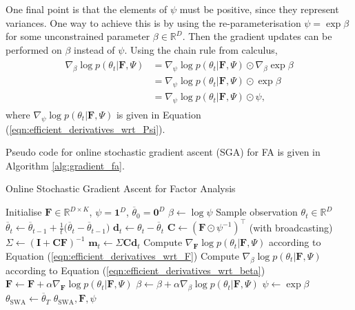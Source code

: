 \documentclass[msc,deptreport.inf]{infthesis} %
\newcommand{\matr}[1]{\mathbf{#1}}
\newcommand{\R}{\mathbb R}
\begin{document}
One final point is that the elements of $\psi$ must be positive, since they represent variances. One way to achieve this is by using the re-parameterisation $\psi = \exp \beta$ for some unconstrained parameter $\beta \in \R^D$. Then the gradient updates can be performed on $\beta$ instead of $\psi$. Using the chain rule from calculus, 
\begin{align}
\begin{split}\label{eqn:efficient_derivatives_wrt_beta}
	\nabla_{\beta} \log p(\theta_t | \matr{F}, \Psi)
	& = \nabla_{\psi} \log p(\theta_t | \matr{F}, \Psi) \odot \nabla_{\beta} \exp \beta \\
	& = \nabla_{\psi} \log p(\theta_t | \matr{F}, \Psi) \odot \exp \beta \\
	& = \nabla_{\psi} \log p(\theta_t | \matr{F}, \Psi) \odot \psi,
\end{split}
\end{align} 
where $\nabla_{\psi} \log p(\theta_t | \matr{F}, \Psi)$ is given in Equation (\ref{eqn:efficient_derivatives_wrt_Psi}).

Pseudo code for online stochastic gradient ascent (SGA) for FA is given in Algorithm \ref{alg:gradient_fa}.

\begin{algorithm}[!htbp] 
	\caption{Online Stochastic Gradient Ascent for Factor Analysis}
	\label{alg:gradient_fa}
	\begin{algorithmic}[1]
		\State Initialise $\matr{F} \in \R^{D \times K}$, $\psi = \matr{1}^D$, $\overline{\theta}_0 = \matr{0}^D$
		\State $\beta \leftarrow \log \psi$
			\State Sample observation $\theta_t \in \R^D$
			\State
				$\overline{\theta}_t \leftarrow  \overline{\theta}_{t-1} + \frac{1}{t}\big(\overline{\theta}_t - \overline{\theta}_{t-1}\big)$
			\State $\matr{d}_t \leftarrow \theta_t - \overline{\theta}_t$
			\State $\matr{C} \leftarrow (\matr{F} \odot \psi^{-1})^\intercal$ (with broadcasting)
			\State $\Sigma \leftarrow (\matr{I} + \matr{C} \matr{F})^{-1}$ 
			\State $\matr{m}_t \leftarrow \Sigma \matr{C} \matr{d}_t$ 
			\State Compute $\nabla_{\matr{F}} \log p(\theta_t | \matr{F}, \Psi)$ 
			according to Equation (\ref{eqn:efficient_derivatives_wrt_F})
			\State Compute $\nabla_{\beta} \log p(\theta_t | \matr{F}, \Psi)$ 
			according to Equation (\ref{eqn:efficient_derivatives_wrt_beta})
			\State $\matr{F} \leftarrow \matr{F} + \alpha \nabla_{\matr{F}} \log p(\theta_t | \matr{F}, \Psi)$
			\State $\beta \leftarrow \beta + \alpha \nabla_{\beta} \log p(\theta_t | \matr{F}, \Psi)$
			\State $\psi \leftarrow \exp \beta$
		\EndFor
		\State $\theta_{\text{SWA}} \leftarrow \overline{\theta}_T$
		\State \Return $\theta_{\text{SWA}}, \matr{F}, \psi$
	\end{algorithmic}
\end{algorithm}
\end{document}
